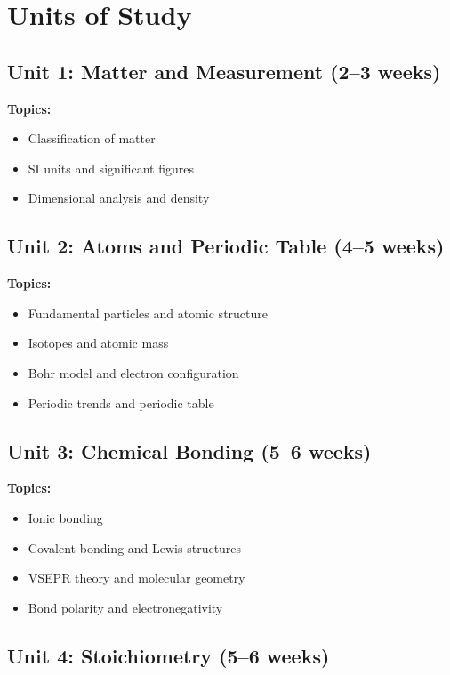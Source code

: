 \documentclass[12pt,oneside]{book}
\begin{document}
\section{Units of Study}

\subsection{Unit 1: Matter and Measurement (2--3 weeks)}

\textbf{Topics:}
\begin{itemize}
    \item Classification of matter
    \item SI units and significant figures
    \item Dimensional analysis and density
\end{itemize}

\subsection{Unit 2: Atoms and Periodic Table (4--5 weeks)}

\textbf{Topics:}
\begin{itemize}
    \item Fundamental particles and atomic structure
    \item Isotopes and atomic mass
    \item Bohr model and electron configuration
    \item Periodic trends and periodic table
\end{itemize}

\subsection{Unit 3: Chemical Bonding (5--6 weeks)}

\textbf{Topics:}
\begin{itemize}
    \item Ionic bonding
    \item Covalent bonding and Lewis structures
    \item VSEPR theory and molecular geometry
    \item Bond polarity and electronegativity
\end{itemize}

\subsection{Unit 4: Stoichiometry (5--6 weeks)}
\end{document}
